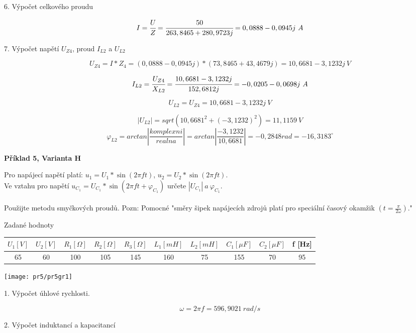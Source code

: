 \documentclass[a4paper,12pt]{article}
\begin{document}
6. Výpočet celkového proudu

$$
I = \cfrac{U}{Z} = \cfrac{50}{263,8465 + 280,9723j} = 0,0888 - 0,0945j\ A 
$$

7. Výpočet napětí $U_{Z4}$, proud $I_{L2}$ a $U_{L2}$

$$
U_{Z4} = I * Z_4 = (0,0888 - 0,0945j) * (73,8465 + 43,4679j) = 10,6681 - 3,1232j\ V
$$

$$
I_{L2} = \cfrac{U_{Z4}}{X_{L2}} = \cfrac{10,6681 - 3,1232j}{152,6812j} = -0,0205 - 0,0698j\ A 
$$

$$
U_{L2} = U_{Z4}  = 10,6681 - 3,1232j\ V
$$

$$|U_{L2}| = sqrt(10,6681^2 + (- 3,1232)^2) = 11,1159\ V$$
$$\varphi_{L2} = arctan \left|\frac{komplexni}{realna}\right| = arctan \left|\frac{- 3,1232}{10,6681}\right| = -0,2848 rad = -16,3183^\circ$$

\newpage


\begin{center}
\textbf{Příklad 5, Varianta H}
\end{center}
\bigskip
Pro napájecí napětí platí: $u_1 = U_1 * \sin (2\pi ft)$, $u_2 = U_2 * \sin (2\pi ft)$.\\
Ve vztahu pro napětí $u_{C_1} = U_{C_1} * \sin (2\pi ft + \varphi_{C_1})$ určete $|U_{C_1}|\ a\ \varphi_{C_1}$.\\\\
Použijte metodu smyčkových proudů.
Pozn: Pomocné "směry šipek napájecích zdrojů platí pro speciální časový okamžik $(t = \frac{\pi}{2\omega})$."
\bigskip

Zadané hodnoty

\begin{tabular} {|  c | c | c |  c | c | c | c | c | c | c | }
\hline
$U_1 [V]$ & $U_2 [V]$ &  $R_1 [\Omega]$  & $R_2 [\Omega]$  &$R_3 [\Omega]$  & $L_1 [mH]$ & $L_2 [mH]$ & $C_1[\mu F]$ & $C_2[\mu F]$  & f [Hz] \\ \hline
65 & 60 & 100 & 105 & 145 & 160 & 75 & 155 & 70 & 95\\ \hline
\end{tabular}
\bigskip

\begin{center}
\texttt{[image: pr5/pr5gr1]}
\end{center}

1. Výpočet úhlové rychlosti.

$$
\omega = 2\pi f = 596,9021\ rad/s
$$

2. Výpočet induktancí a kapacitancí
\end{document}
